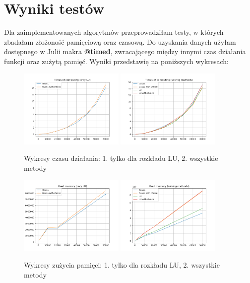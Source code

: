 \documentclass{article}
\begin{document}
\section{Wyniki testów}
Dla zaimplementowanych algorytmów przeprowadziłam testy, w 
których zbadałam złożoność pamięciową oraz czasową. Do uzyskania 
danych użyłam dostępnego w Julii makra \textbf{@timed}, zwracającego 
między innymi czas działania funkcji oraz zużytą pamięć. Wyniki 
przedstawię na poniższych wykresach:

\begin{figure}[H]
    \centering
    \includegraphics[width=0.45\textwidth]{times_lu.png}
    \includegraphics[width=0.45\textwidth]{times_solving.png}
    \caption{Wykresy czasu działania: 1. tylko dla rozkładu LU, 2. wszystkie metody}
\end{figure}
\begin{figure}[H]
    \centering
    \includegraphics[width=0.45\textwidth]{memory_lu.png}
    \includegraphics[width=0.45\textwidth]{memory_solving.png}
    \caption{Wykresy zużycia pamięci: 1. tylko dla rozkładu LU, 2. wszystkie metody}
\end{figure}
\end{document}
